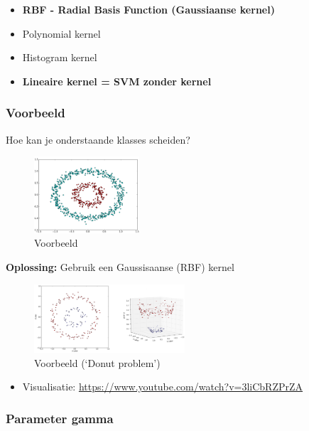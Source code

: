 \documentclass{article}
\begin{document}
\begin{itemize}
    \item \textbf{RBF - Radial Basis Function (Gaussiaanse kernel)}
    \item Polynomial kernel
    \item Histogram kernel
    \item \textbf{Lineaire kernel = SVM zonder kernel}
\end{itemize}

\subsubsection{Voorbeeld}

Hoe kan je onderstaande klasses scheiden?

\begin{figure}[H]
    \centering
    \includegraphics[width=0.35\textwidth]{svm-kernels.png}
    \caption{Voorbeeld}
\end{figure}

\textbf{Oplossing:} Gebruik een Gaussisaanse (RBF) kernel

\begin{figure}[H]
    \centering
    \includegraphics[width=0.5\textwidth]{svm-kernels2.png}
    \caption{Voorbeeld (`Donut problem')}
\end{figure}

\begin{itemize}
    \item Visualisatie: \url{https://www.youtube.com/watch?v=3liCbRZPrZA}
\end{itemize}

\subsubsection{Parameter gamma}
\end{document}

